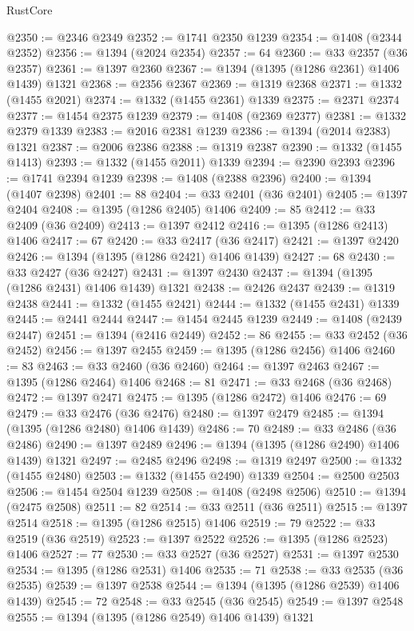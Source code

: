 \begin{lexlean}{RustCore}
\begin{coremodule}
@2350 := @2346 @2349
@2352 := @1741 @2350 @1239
@2354 := @1408 (@2344 @2352)
@2356 := @1394 (@2024 @2354)
@2357 := 64
@2360 := @33 @2357 (@36 @2357)
@2361 := @1397 @2360
@2367 := @1394 (@1395 (@1286 @2361) @1406 @1439) @1321
@2368 := @2356 @2367
@2369 := @1319 @2368
@2371 := @1332 (@1455 @2021)
@2374 := @1332 (@1455 @2361) @1339
@2375 := @2371 @2374
@2377 := @1454 @2375 @1239
@2379 := @1408 (@2369 @2377)
@2381 := @1332 @2379 @1339
@2383 := @2016 @2381 @1239
@2386 := @1394 (@2014 @2383) @1321
@2387 := @2006 @2386
@2388 := @1319 @2387
@2390 := @1332 (@1455 @1413)
@2393 := @1332 (@1455 @2011) @1339
@2394 := @2390 @2393
@2396 := @1741 @2394 @1239
@2398 := @1408 (@2388 @2396)
@2400 := @1394 (@1407 @2398)
@2401 := 88
@2404 := @33 @2401 (@36 @2401)
@2405 := @1397 @2404
@2408 := @1395 (@1286 @2405) @1406
@2409 := 85
@2412 := @33 @2409 (@36 @2409)
@2413 := @1397 @2412
@2416 := @1395 (@1286 @2413) @1406
@2417 := 67
@2420 := @33 @2417 (@36 @2417)
@2421 := @1397 @2420
@2426 := @1394 (@1395 (@1286 @2421) @1406 @1439)
@2427 := 68
@2430 := @33 @2427 (@36 @2427)
@2431 := @1397 @2430
@2437 := @1394 (@1395 (@1286 @2431) @1406 @1439) @1321
@2438 := @2426 @2437
@2439 := @1319 @2438
@2441 := @1332 (@1455 @2421)
@2444 := @1332 (@1455 @2431) @1339
@2445 := @2441 @2444
@2447 := @1454 @2445 @1239
@2449 := @1408 (@2439 @2447)
@2451 := @1394 (@2416 @2449)
@2452 := 86
@2455 := @33 @2452 (@36 @2452)
@2456 := @1397 @2455
@2459 := @1395 (@1286 @2456) @1406
@2460 := 83
@2463 := @33 @2460 (@36 @2460)
@2464 := @1397 @2463
@2467 := @1395 (@1286 @2464) @1406
@2468 := 81
@2471 := @33 @2468 (@36 @2468)
@2472 := @1397 @2471
@2475 := @1395 (@1286 @2472) @1406
@2476 := 69
@2479 := @33 @2476 (@36 @2476)
@2480 := @1397 @2479
@2485 := @1394 (@1395 (@1286 @2480) @1406 @1439)
@2486 := 70
@2489 := @33 @2486 (@36 @2486)
@2490 := @1397 @2489
@2496 := @1394 (@1395 (@1286 @2490) @1406 @1439) @1321
@2497 := @2485 @2496
@2498 := @1319 @2497
@2500 := @1332 (@1455 @2480)
@2503 := @1332 (@1455 @2490) @1339
@2504 := @2500 @2503
@2506 := @1454 @2504 @1239
@2508 := @1408 (@2498 @2506)
@2510 := @1394 (@2475 @2508)
@2511 := 82
@2514 := @33 @2511 (@36 @2511)
@2515 := @1397 @2514
@2518 := @1395 (@1286 @2515) @1406
@2519 := 79
@2522 := @33 @2519 (@36 @2519)
@2523 := @1397 @2522
@2526 := @1395 (@1286 @2523) @1406
@2527 := 77
@2530 := @33 @2527 (@36 @2527)
@2531 := @1397 @2530
@2534 := @1395 (@1286 @2531) @1406
@2535 := 71
@2538 := @33 @2535 (@36 @2535)
@2539 := @1397 @2538
@2544 := @1394 (@1395 (@1286 @2539) @1406 @1439)
@2545 := 72
@2548 := @33 @2545 (@36 @2545)
@2549 := @1397 @2548
@2555 := @1394 (@1395 (@1286 @2549) @1406 @1439) @1321

\end{coremodule}
\end{lexlean}
